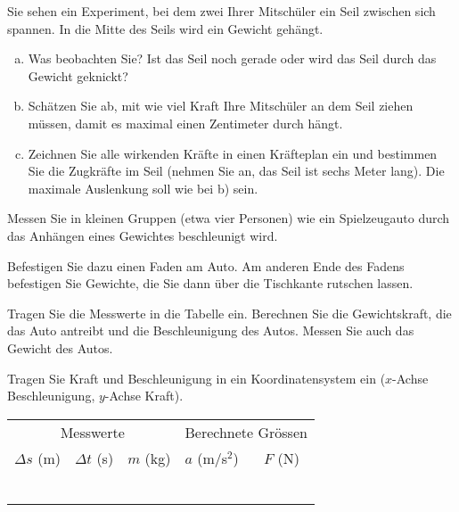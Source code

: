 \documentclass[12pt,a4paper,twoside]{article}
\begin{document}
\begin{aufgabe}
	Sie sehen ein Experiment, bei dem zwei Ihrer Mitschüler ein Seil zwischen sich spannen.
	In die Mitte des Seils wird ein Gewicht gehängt.
	\begin{enumerate}[a)]
		\item Was beobachten Sie? Ist das Seil noch gerade oder wird das Seil durch das Gewicht geknickt?
		\item Schätzen Sie ab, mit wie viel Kraft Ihre Mitschüler an dem Seil ziehen müssen, damit es maximal einen Zentimeter durch hängt.
		\item Zeichnen Sie alle wirkenden Kräfte in einen Kräfteplan ein und bestimmen Sie die Zugkräfte im Seil
			(nehmen Sie an, das Seil ist sechs Meter lang).
			Die maximale Auslenkung soll wie bei b) sein.
	\end{enumerate}
\end{aufgabe}



\begin{aufgabe}
	Messen Sie in kleinen Gruppen (etwa vier Personen)
	wie ein Spielzeugauto durch das Anhängen eines Gewichtes beschleunigt wird.

	Befestigen Sie dazu einen Faden am Auto. Am anderen Ende des Fadens befestigen Sie
	Gewichte, die Sie dann über die Tischkante rutschen lassen.

	Tragen Sie die Messwerte in die Tabelle ein. 
	Berechnen Sie die Gewichtskraft, die das Auto antreibt und die Beschleunigung des Autos.
	Messen Sie auch das Gewicht des Autos.

	Tragen Sie Kraft und Beschleunigung in ein Koordinatensystem ein ($x$-Achse Beschleunigung, $y$-Achse Kraft).

\newcommand\leereZ{\phantom{x} & & & &  \\\hline}


	\begin{center}
		
		\begin{tabular}{p{}|p{}|p{}||p{}|p{}}
			\multicolumn{3}{c||}{Messwerte} & \multicolumn{2}{c}{Berechnete Grössen}\\
			$\Delta s$ (m) & $\Delta t$ (s) & $m$ (kg) & $a$ (m/s$^2$)& $F$ (N)\\\hline
			
\leereZ
\leereZ
\leereZ
\leereZ
\leereZ
\leereZ
		\end{tabular}

	
	\end{center}

\end{aufgabe}
\end{document}
